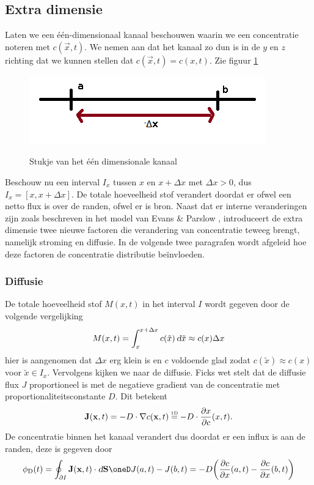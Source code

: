 \subsection{Extra dimensie}
Laten we een één-dimensionaal kanaal beschouwen waarin we een concentratie noteren met $c(\vec{x},t)$. We nemen aan dat het kanaal zo dun is in de $y$ en $z$ richting dat we kunnen stellen dat $c(\vec{x},t)=c(x,t)$. Zie figuur \ref{fig:xchannel}

\begin{figure}[h]
	\centering
	\includegraphics[]{DeltaX.png}
	\label{fig:xchannel}
	\caption{Stukje van het één dimensionale kanaal}
\end{figure}

Beschouw nu een interval $I_x$ tussen $x$ en $x+\Delta x$ met $\Delta x > 0$, dus $I_x = [x, x+\Delta x]$. De totale hoeveelheid stof verandert doordat er ofwel een netto flux is over de randen, ofwel er is bron. Naast dat er interne veranderingen zijn zoals beschreven in het model van Evans \& Parslow \cite{Algen1985}, introduceert de extra dimensie twee nieuwe factoren die verandering van concentratie teweeg brengt, namelijk stroming en diffusie. In de volgende twee paragrafen wordt afgeleid hoe deze factoren de concentratie distributie be\"{i}nvloeden.

\subsubsection{Diffusie}
De totale hoeveelheid stof $M(x,t)$ in het interval $I$ wordt gegeven door de volgende vergelijking
\begin{equation}
	M(x,t) = \int_x^{x+\Delta x} c(\tilde{x})\dif \tilde{x} \approx c(x)\Delta x
\end{equation}
hier is aangenomen dat $\Delta x$ erg klein is en $c$ voldoende glad zodat $c(\tilde{x}) \approx c(x)$ voor $\tilde{x} \in I_x$. Vervolgens kijken we naar de diffusie. Ficks wet stelt dat de diffusie flux $J$ proportioneel is met de negatieve gradient van de concentratie met proportionaliteitsconstante $D$. Dit betekent
\begin{equation}
	\vec{J}(\vec{x},t) = -D\cdot  \nabla c(\vec{x},t) \overEquals{1D} -D\cdot \dd{x} c(x,t).
\end{equation}
De concentratie binnen het kanaal verandert dus doordat er een influx is aan de randen, deze is gegeven door
\begin{equation}
	\phi_{\text{D}}(t) = \oint_{\partial I} \vec{J}(\vec{x},t)\cdot \dif \vec{S} \oneD J(a,t)-J(b,t) = -D\bigg(\dd{c}{x}(a,t) - \dd{c}{x}(b,t)\bigg)
\end{equation}

